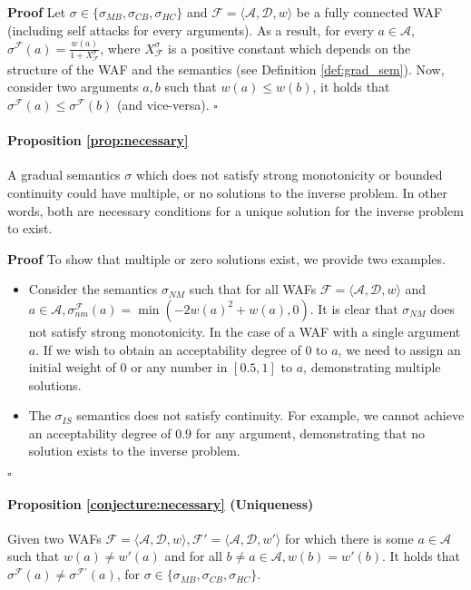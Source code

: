 \documentclass{article}
\newcommand{\AF}{\mathcal{F}}
\newcommand{\A}{\mathcal{A}}
\newcommand{\D}{\mathcal{D}}
\newenvironment{proof}{\textbf{Proof}}{\hfill$\square$}
\begin{document}
\medskip

\begin{proof}
Let $\sigma \in \{ \sigma_{MB}, \sigma_{CB}, \sigma_{HC}\}$ and $\AF = \langle \A, \D, w \rangle$ be a fully connected WAF (including self attacks for every arguments).
%
As a result, for every $a \in \A$, $\sigma^\AF(a) = \frac{w(a)}{1+ X_\AF^\sigma}$, where $X_\AF^\sigma$ is a positive constant which depends on the structure of the WAF and the semantics (see Definition \ref{def:grad_sem}).
%
Now, consider two arguments $a,b$ such that $w(a) \leq w(b)$, it holds that $\sigma^\AF(a) \leq \sigma^\AF(b)$ (and vice-versa).
\end{proof}

\paragraph{Proposition \ref{prop:necessary}}

A gradual semantics $\sigma$ which does not satisfy strong monotonicity or bounded  continuity could have multiple, or no solutions to the inverse problem. In other words, both are necessary conditions for a unique solution for the inverse problem to exist.

\medskip

\begin{proof}
To show that multiple or zero solutions exist, we provide two examples.
\begin{itemize}
    \item Consider the semantics $\sigma_{NM}$ such that for all WAFs $\AF = \langle \A, \D, w \rangle$ and $a \in \A, \sigma_{nm}^\AF(a)= \min (-2w(a)^2+w(a), 0)$. It is clear that $\sigma_{NM}$ does not satisfy strong monotonicity. 
    In the case of a WAF with a single argument $a$. If we wish to obtain an acceptability degree of 0 to $a$, we need to assign an initial weight of $0$ or any number in $[0.5, 1]$ to $a$, demonstrating multiple solutions.

    \item The $\sigma_{IS}$ semantics does not satisfy continuity. For example, we cannot achieve an acceptability degree of $0.9$ for any argument, demonstrating that no solution exists to the inverse problem.
\end{itemize}
\end{proof}



\paragraph{Proposition \ref{conjecture:necessary} (Uniqueness)} Given two WAFs $\AF=\langle \A, \D, w \rangle, \AF'=\langle \A, \D,w'\rangle$ for which there is some $a \in \A$ such that $w(a)\neq w'(a)$ and for all $ b \neq a \in \A, w(b)=w'(b)$. It holds that $\sigma^\AF(a) \neq \sigma^{\AF'}(a)$, for $\sigma \in \{\sigma_{MB},\sigma_{CB},\sigma_{HC}\}$.
\end{document}
